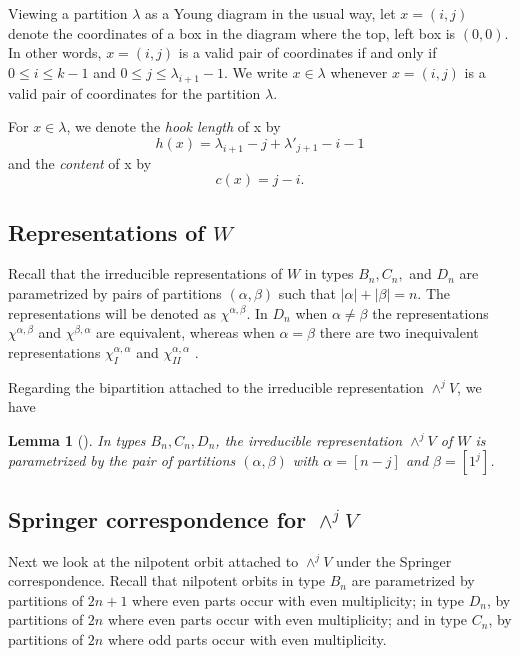 \documentclass[10pt]{amsart}
\newcommand{\dualp}{\lambda'}
\theoremstyle{plain}
\newtheorem{lemma}[theorem]{Lemma}
\theoremstyle{definition}
\theoremstyle{remark}
\begin{document}
Viewing a partition $\lambda$ as a Young diagram in the usual way, let $x = (i,j)$ denote the coordinates of a box
in the diagram where the top, left box is $(0,0)$.  
In other words, $x = (i,j)$ is a valid pair of coordinates if and only if $0 \leq i \leq k-1$ and $0 \leq j \leq \lambda_{i+1}-1$.
We write $x \in \lambda$ whenever $x = (i,j)$ is a valid pair of coordinates for the partition $\lambda$.

For $x \in \lambda$, we denote the {\it hook length} of x by 
$$h(x) = \lambda_{i+1} - j + \dualp_{j+1} - i -1$$
and the {\it content} of x by
$$c(x) = j-i.$$

\subsection{\texorpdfstring{Representations of $W$}{Representations of W}}

Recall that the irreducible representations of $W$ in types $B_n, C_n,$ and $D_n$ are parametrized by pairs of partitions $(\alpha, \beta)$ such that $|\alpha| + |\beta| = n$.  The representations 
will be denoted as $\chi^{\alpha, \beta}$.  In $D_n$ when $\alpha \neq \beta$
the representations $\chi^{\alpha, \beta}$ and $\chi^{\beta, \alpha}$ are equivalent, whereas when $\alpha = \beta$
there are two inequivalent representations $\chi^{\alpha, \alpha}_I$ and $\chi^{\alpha, \alpha}_{II}$ .

Regarding the bipartition attached to the irreducible representation $\wedge^j V$, we have 

\begin{lemma}[\cite{macdonald:book}]
In types $B_n, C_n, D_n$, the irreducible representation 
$\wedge^j V$ of $W$ is parametrized by the pair of partitions $(\alpha, \beta)$ with $\alpha = [n-j]$ and $\beta = [1^j]$.
\end{lemma}

\subsection{\texorpdfstring{Springer correspondence for $\wedge^j V$}{Springer correspondence for exterior powers of V}}

Next we look at the nilpotent orbit attached to $\wedge^j V$ under the Springer correspondence.
Recall that nilpotent orbits in type $B_n$ are parametrized by partitions of $2n+1$ where 
even parts occur with even multiplicity;
in type $D_n$, by partitions of $2n$ where 
even parts occur with even multiplicity;
and in type $C_n$, by partitions of $2n$ where 
odd parts occur with even multiplicity.
\end{document}
